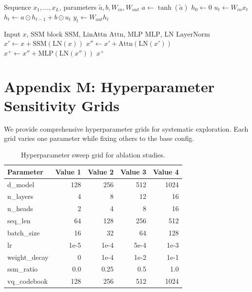 \documentclass{article}
\begin{document}
\begin{algorithm}
\caption{Diagonal SSM Recurrence}
\begin{algorithmic}[1]
\Require Sequence $x_1, \dots, x_L$, parameters $\tilde{a}, b, W_{in}, W_{out}$
\State $a \leftarrow \tanh(\tilde{a})$ 
\State $h_0 \leftarrow 0$ 
    \State $u_t \leftarrow W_{in} x_t$
    \State $h_t \leftarrow a \odot h_{t-1} + b \odot u_t$ 
    \State $y_t \leftarrow W_{out} h_t$
\EndFor
\end{algorithmic}
\end{algorithm}

\begin{algorithm}
\caption{Hybrid Block Forward Pass}
\begin{algorithmic}[1]
\Require Input $x$, SSM block $\mathrm{SSM}$, LinAttn $\mathrm{Attn}$, MLP $\mathrm{MLP}$, LN $\mathrm{LayerNorm}$
\State $x' \leftarrow x + \mathrm{SSM}(\mathrm{LN}(x))$
\State $x'' \leftarrow x' + \mathrm{Attn}(\mathrm{LN}(x'))$
\State $x^+ \leftarrow x'' + \mathrm{MLP}(\mathrm{LN}(x''))$
\State \Return $x^+$
\end{algorithmic}
\end{algorithm}

\section{Appendix M: Hyperparameter Sensitivity Grids}
We provide comprehensive hyperparameter grids for systematic exploration. Each grid varies one parameter while fixing others to the base config.

\begin{table}[h]
\centering
\begin{tabular}{lrrrr}
\toprule
Parameter & Value 1 & Value 2 & Value 3 & Value 4 \\\midrule
d\_model & 128 & 256 & 512 & 1024 \\
n\_layers & 4 & 8 & 12 & 16 \\
n\_heads & 2 & 4 & 8 & 16 \\
seq\_len & 64 & 128 & 256 & 512 \\
batch\_size & 16 & 32 & 64 & 128 \\
lr & 1e-5 & 1e-4 & 5e-4 & 1e-3 \\
weight\_decay & 0 & 1e-4 & 1e-2 & 1e-1 \\
ssm\_ratio & 0.0 & 0.25 & 0.5 & 1.0 \\
vq\_codebook & 128 & 256 & 512 & 1024 \\
\bottomrule
\end{tabular}
\caption{Hyperparameter sweep grid for ablation studies.}
\end{table}
\end{document}
